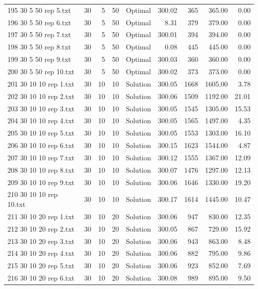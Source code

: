 \begin{longtable}{lrrllrrrr}
195 30 5 50 rep 5.txt & 30 & 5 & 50 & Optimal & 300.02 & 365 & 365.00 &  0.00\\
196 30 5 50 rep 6.txt & 30 & 5 & 50 & Optimal &  8.31 & 379 & 379.00 &  0.00\\
197 30 5 50 rep 7.txt & 30 & 5 & 50 & Optimal & 300.01 & 394 & 394.00 &  0.00\\
198 30 5 50 rep 8.txt & 30 & 5 & 50 & Optimal &  0.08 & 445 & 445.00 &  0.00\\
199 30 5 50 rep 9.txt & 30 & 5 & 50 & Optimal & 300.03 & 360 & 360.00 &  0.00\\
200 30 5 50 rep 10.txt & 30 & 5 & 50 & Optimal & 300.02 & 373 & 373.00 &  0.00\\
201 30 10 10 rep 1.txt & 30 & 10 & 10 & Solution & 300.05 & 1668 & 1605.00 &  3.78\\
202 30 10 10 rep 2.txt & 30 & 10 & 10 & Solution & 300.06 & 1509 & 1192.00 & 21.01\\
203 30 10 10 rep 3.txt & 30 & 10 & 10 & Solution & 300.05 & 1545 & 1305.00 & 15.53\\
204 30 10 10 rep 4.txt & 30 & 10 & 10 & Solution & 300.05 & 1565 & 1497.00 &  4.35\\
205 30 10 10 rep 5.txt & 30 & 10 & 10 & Solution & 300.05 & 1553 & 1303.00 & 16.10\\
206 30 10 10 rep 6.txt & 30 & 10 & 10 & Solution & 300.15 & 1623 & 1544.00 &  4.87\\
207 30 10 10 rep 7.txt & 30 & 10 & 10 & Solution & 300.12 & 1555 & 1367.00 & 12.09\\
208 30 10 10 rep 8.txt & 30 & 10 & 10 & Solution & 300.07 & 1476 & 1297.00 & 12.13\\
209 30 10 10 rep 9.txt & 30 & 10 & 10 & Solution & 300.06 & 1646 & 1330.00 & 19.20\\
210 30 10 10 rep 10.txt & 30 & 10 & 10 & Solution & 300.17 & 1614 & 1445.00 & 10.47\\
211 30 10 20 rep 1.txt & 30 & 10 & 20 & Solution & 300.06 & 947 & 830.00 & 12.35\\
212 30 10 20 rep 2.txt & 30 & 10 & 20 & Solution & 300.05 & 867 & 729.00 & 15.92\\
213 30 10 20 rep 3.txt & 30 & 10 & 20 & Solution & 300.06 & 943 & 863.00 &  8.48\\
214 30 10 20 rep 4.txt & 30 & 10 & 20 & Solution & 300.06 & 882 & 795.00 &  9.86\\
215 30 10 20 rep 5.txt & 30 & 10 & 20 & Solution & 300.06 & 923 & 852.00 &  7.69\\
216 30 10 20 rep 6.txt & 30 & 10 & 20 & Solution & 300.08 & 989 & 895.00 &  9.50\\

\end{longtable}
